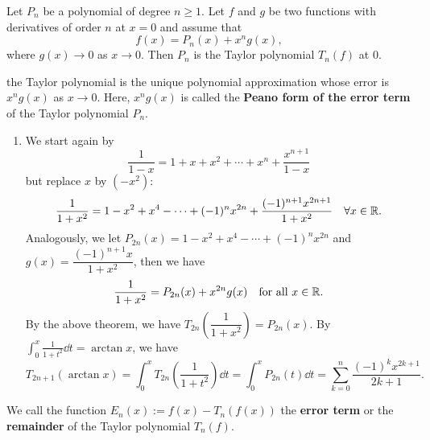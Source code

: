     \begin{theoremenv}
        Let $P_n$ be a polynomial of degree $n\ge 1$. Let $f$ and $g$ be two functions with derivatives of order $n$ at $x=0$ and assume that $$f(x)=P_n(x)+x^n g(x),$$ where $g(x)\to 0$ as $x\to 0$. Then $P_n$ is the Taylor polynomial $T_n(f)$ at 0.
    \end{theoremenv}
    \begin{remarkenv}
        the Taylor polynomial is the unique polynomial approximation whose error is \(x^ng(x)\) as \(x\to0\). Here, $x^n g(x)$ is called the \textbf{Peano form of the error term} of the Taylor polynomial $P_n$.
    \end{remarkenv}
    \begin{exampleenv}
        \begin{enumerate}[label=(\arabic*),start=7]
        \item We start again by
        \[
        \frac{1}{1-x} = 1 + x + x^2 + \cdots + x^n + \frac{x^{n+1}}{1-x}
        \]
        but replace $x$ by $(-x^2)$:
        \[
        \frac{1}{1+x^2} = 1 - x^2 + x^4 - \cdots + (-1)^n x^{2n} + \frac{(-1)^{n+1} x^{2n+1}}{1+x^2}\quad \forall x\in \mathbb{R}.
        \]
        Analogously, we let $P_{2n}(x) = 1 - x^2 + x^4 - \cdots + (-1)^n x^{2n}$ and $g(x) = \dfrac{(-1)^{n+1} x}{1+x^2}$, then we have
        \[
        \frac{1}{1+x^2} = P_{2n}(x) + x^{2n} g(x) \quad \text{for all } x\in \mathbb{R}.
        \]
        By the above theorem, we have $T_{2n}\left( \dfrac{1}{1+x^2} \right) = P_{2n}(x)$. By $\displaystyle \int_0^x \frac{1}{1+t^2} \dd t = \arctan x$, we have
        \[
        T_{2n+1}(\arctan x) = \int_0^x T_{2n}\left( \frac{1}{1+t^2} \right) \dd t = \int_0^x P_{2n}(t) \dd t = \sum_{k=0}^n \frac{(-1)^k x^{2k+1}}{2k+1}.
        \]
        \end{enumerate}
    \end{exampleenv}
    \begin{definitionenv}
        We call the function $E_n(x) := f(x) - T_n(f(x))$ the \textbf{error term} or the \textbf{remainder} of the Taylor polynomial $T_n(f)$.
    \end{definitionenv}
